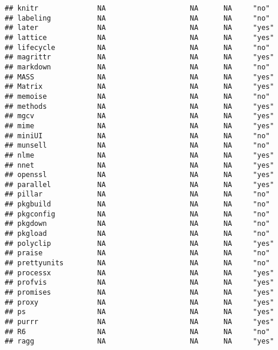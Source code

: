 \documentclass[
]{article}
\begin{document}
\begin{verbatim}
## knitr              NA                    NA      NA     "no"            
## labeling           NA                    NA      NA     "no"            
## later              NA                    NA      NA     "yes"           
## lattice            NA                    NA      NA     "yes"           
## lifecycle          NA                    NA      NA     "no"            
## magrittr           NA                    NA      NA     "yes"           
## markdown           NA                    NA      NA     "no"            
## MASS               NA                    NA      NA     "yes"           
## Matrix             NA                    NA      NA     "yes"           
## memoise            NA                    NA      NA     "no"            
## methods            NA                    NA      NA     "yes"           
## mgcv               NA                    NA      NA     "yes"           
## mime               NA                    NA      NA     "yes"           
## miniUI             NA                    NA      NA     "no"            
## munsell            NA                    NA      NA     "no"            
## nlme               NA                    NA      NA     "yes"           
## nnet               NA                    NA      NA     "yes"           
## openssl            NA                    NA      NA     "yes"           
## parallel           NA                    NA      NA     "yes"           
## pillar             NA                    NA      NA     "no"            
## pkgbuild           NA                    NA      NA     "no"            
## pkgconfig          NA                    NA      NA     "no"            
## pkgdown            NA                    NA      NA     "no"            
## pkgload            NA                    NA      NA     "no"            
## polyclip           NA                    NA      NA     "yes"           
## praise             NA                    NA      NA     "no"            
## prettyunits        NA                    NA      NA     "no"            
## processx           NA                    NA      NA     "yes"           
## profvis            NA                    NA      NA     "yes"           
## promises           NA                    NA      NA     "yes"           
## proxy              NA                    NA      NA     "yes"           
## ps                 NA                    NA      NA     "yes"           
## purrr              NA                    NA      NA     "yes"           
## R6                 NA                    NA      NA     "no"            
## ragg               NA                    NA      NA     "yes"           

\end{verbatim}
\end{document}
